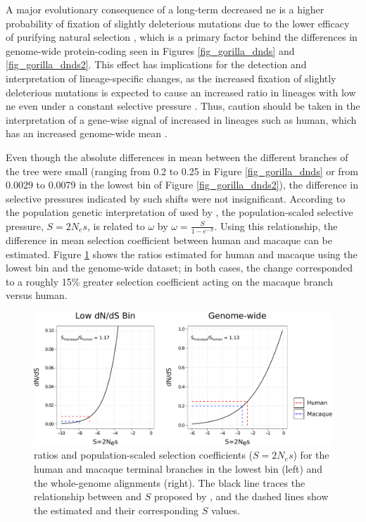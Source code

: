 A major evolutionary consequence of a long-term decreased \ac{ne} is a
higher probability of fixation of slightly deleterious mutations due
to the lower efficacy of purifying natural selection \citep{EyreWalker2002},
which is a primary factor behind the differences in genome-wide
protein-coding \dnds seen in Figures \ref{fig_gorilla_dnds} and
\ref{fig_gorilla_dnds2}. This effect has implications for the
detection and interpretation of lineage-specific \dnds changes, as the
increased fixation of slightly deleterious mutations is expected to
cause an increased \dnds ratio in lineages with low \ac{ne} even under
a constant selective pressure \citep{Ellegren2009}. Thus, caution
should be taken in the interpretation of a gene-wise signal of
increased \dnds in lineages such as human, which has an increased
genome-wide mean \dnds.


Even though the absolute
differences in mean \dnds between the different branches of the tree
were small (ranging from 0.2 to 0.25 in Figure \ref{fig_gorilla_dnds}
or from 0.0029 to 0.0079 in the lowest bin of Figure
\ref{fig_gorilla_dnds2}), the difference in selective pressures
indicated by such shifts were not insignificant. According to the
population genetic interpretation of \dnds used by
\citet{Nielsen2003}, the population-scaled selective pressure,
$S=2N_{e}s$, is related to $\omega$ by
$\omega=\frac{S}{1-e^{-S}}$. Using this relationship, the difference
in mean selection coefficient between human and macaque can be
estimated. Figure \ref{fig_s_w} shows the \dnds ratios estimated for
human and macaque using the lowest \dnds bin and the genome-wide
dataset; in both cases, the \dnds change corresponded to a roughly
15\% greater selection coefficient acting on the macaque branch versus
human.

\begin{figure}
\centering
\includegraphics[scale=0.65]{Figs/s_w.pdf}
\caption{\dnds ratios and population-scaled selection coefficients
  ($S=2N_{e}s$) for the human and macaque terminal branches in the
  lowest \dnds bin (left) and the whole-genome alignments (right). The
  black line traces the relationship between \dnds and $S$ proposed by
  \citet{Nielsen2003}, and the dashed lines show the estimated \dnds
  and their corresponding $S$ values.}
\label{fig_s_w}
\end{figure}


